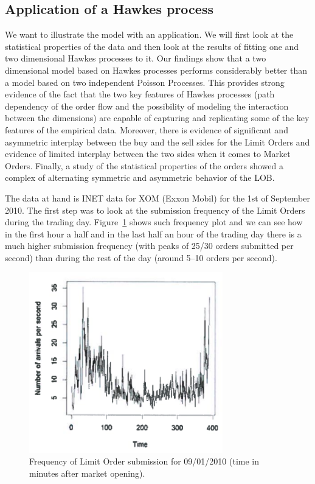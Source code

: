 \subsection{Application of a Hawkes process}


We want to illustrate the model with an application. We will first look at the statistical properties of the data and then look at the results of fitting one and two dimensional Hawkes processes to it. Our findings show that a two dimensional model based on Hawkes processes performs considerably better than a model based on two independent Poisson Processes. This provides strong evidence of the fact that the two key features of Hawkes processes (path dependency of the order flow and the possibility of modeling the interaction between the dimensions) are capable of capturing and replicating some of the key features of the empirical data. Moreover, there is evidence of significant and asymmetric interplay between the buy and the sell sides for the Limit Orders and evidence of limited interplay between the two sides when it comes to Market Orders. Finally, a study of the statistical properties of the orders showed a complex of alternating symmetric and asymmetric behavior of the LOB. 


The data at hand is INET data for XOM (Exxon Mobil) for the 1st of September 2010. The first step was to look at the submission frequency of the Limit Orders during the trading day. Figure~\ref{fig:freqsubmitarrivals} shows such frequency plot and we can see how in the first hour a half and in the last half an hour of the trading day there is a much higher submission frequency (with peaks of 25/30 orders submitted per second) than during the rest of the day (around 5--10 orders per second).
	\begin{figure}[!ht]
   	\centering
   	\includegraphics[width=0.75\textwidth]{chapters/chapter_el_exch/figures/freqsubmit.png} 
   	\caption{Frequency of Limit Order submission for 09/01/2010 (time in minutes after market opening). \label{fig:freqsubmitarrivals}}
	\end{figure}


